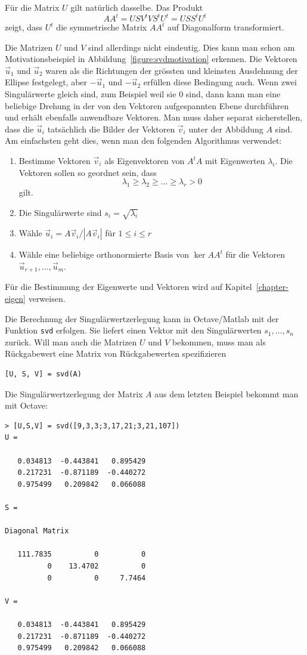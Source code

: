 Für die Matrix $U$ gilt natürlich dasselbe.
Das Produkt
\[
AA^t
=
USV^tVS^tU^t
=
USS^tU^t
\]
zeigt, dass $U^t$ die symmetrische Matrix $AA^t$ auf Diagonalform
transformiert.

Die Matrizen $U$ und $V$ sind allerdings nicht eindeutig.
Dies kann man schon am Motivationsbeispiel in
Abbildung~\ref{figure:svdmotivation} erkennen.
Die Vektoren $\vec{u}_1$ und $\vec{u}_2$ waren als die Richtungen
der grössten und kleinsten Ausdehnung der Ellipse festgelegt,
aber $-\vec{u}_1$ und $-\vec{u}_2$ erfüllen diese Bedingung auch.
Wenn zwei Singulärwerte gleich sind, zum Beispiel weil sie 0 sind,
dann kann man eine beliebige Drehung in der von den Vektoren aufgespannten
Ebene durchführen und erhält ebenfalls anwendbare Vektoren.
Man muss daher separat sicherstellen, dass die $\vec{u}_i$ tatsächlich
die Bilder der Vektoren $\vec{v}_i$ unter der Abbildung $A$ sind.
Am einfachsten geht dies, wenn man den folgenden Algorithmus verwendet:
\begin{enumerate}
\item
Bestimme Vektoren $\vec{v}_i$ als Eigenvektoren von $A^tA$ mit
Eigenwerten $\lambda_i$.
Die Vektoren sollen so geordnet sein, dass 
\[
\lambda_1 \ge \lambda_2 \ge \dots \ge \lambda_r > 0
\]
gilt.
\item
Die Singulärwerte sind $s_i = \sqrt{\lambda_i}$
\item
Wähle $\vec{u}_i=A\vec{v}_i/|A\vec{v}_i|$ für $1\le i\le r$
\item
Wähle eine beliebige orthonormierte Basis von $\operatorname{ker} AA^t$
für die Vektoren $\vec{u}_{r+1},\dots,\vec{u}_m$.
\end{enumerate}
Für die Bestimmung der Eigenwerte und Vektoren wird auf
Kapitel~\ref{chapter-eigen} verweisen.

Die Berechnung der Singulärwertzerlegung kann in Octave/Matlab
mit der Funktion {\tt svd} erfolgen.
Sie liefert einen Vektor mit den Singulärwerten $s_1,\dots,s_n$ zurück.
Will man auch die Matrizen $U$ und $V$ bekommen, muss man als Rückgabewert
eine Matrix von Rückgabewerten spezifizieren
\begin{verbatim}
[U, S, V] = svd(A)
\end{verbatim}

\begin{beispiel}
Die Singulärwertzerlegung der Matrix $A$ aus dem letzten Beispiel 
bekommt man mit Octave:
\begin{verbatim}
> [U,S,V] = svd([9,3,3;3,17,21;3,21,107])
U =

   0.034813  -0.443841   0.895429
   0.217231  -0.871189  -0.440272
   0.975499   0.209842   0.066088

S =

Diagonal Matrix

   111.7835          0          0
          0    13.4702          0
          0          0     7.7464

V =

   0.034813  -0.443841   0.895429
   0.217231  -0.871189  -0.440272
   0.975499   0.209842   0.066088
\end{verbatim}
\end{beispiel}
